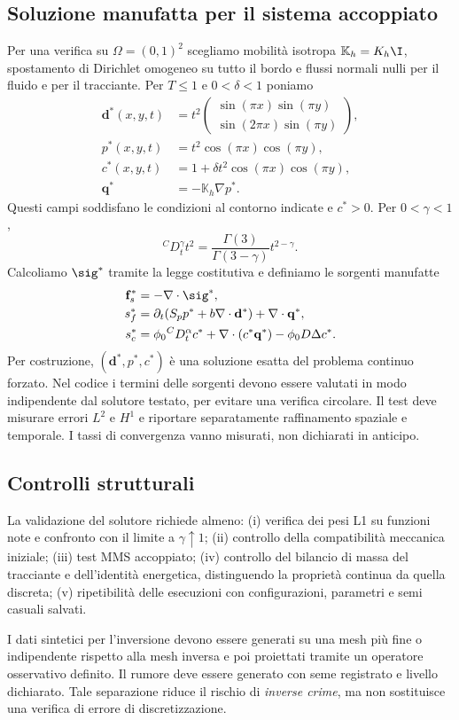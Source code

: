 \subsection{Soluzione manufatta per il sistema accoppiato}
Per una verifica su $\Omega=(0,1)^2$ scegliamo mobilità isotropa $\mathbb K_h=K_h\I$, spostamento di Dirichlet omogeneo su tutto il bordo e flussi normali nulli per il fluido e per il tracciante. Per $T\le1$ e $0<\delta<1$ poniamo
\begin{align}
\mathbf d^*(x,y,t)&=t^2\begin{pmatrix}\sin(\pi x)\sin(\pi y)\\\sin(2\pi x)\sin(\pi y)\end{pmatrix},\\
p^*(x,y,t)&=t^2\cos(\pi x)\cos(\pi y),\\
c^*(x,y,t)&=1+\delta t^2\cos(\pi x)\cos(\pi y),\\
\mathbf q^*&=-\mathbb K_h\nabla p^*.
\end{align}
Questi campi soddisfano le condizioni al contorno indicate e $c^*>0$. Per $0<\gamma<1$,
\begin{equation}
{}^C D_t^\gamma t^2=\frac{\Gamma(3)}{\Gamma(3-\gamma)}t^{2-\gamma}.
\label{eq:caputo-t2}
\end{equation}
Calcoliamo $\sig^*$ tramite la legge costitutiva e definiamo le sorgenti manufatte
\begin{align}
\mathbf f_s^*&=-\nabla\cdot\sig^*,\\
s_f^*&=\partial_t(S_pp^*+b\nabla\cdot\mathbf d^*)+\nabla\cdot\mathbf q^*,\\
s_c^*&=\phi_0{}^C D_t^\alpha c^*+\nabla\cdot(c^*\mathbf q^*)-\phi_0D\Delta c^*.
\label{eq:mms-sources}
\end{align}
Per costruzione, $(\mathbf d^*,p^*,c^*)$ è una soluzione esatta del problema continuo forzato. Nel codice i termini delle sorgenti devono essere valutati in modo indipendente dal solutore testato, per evitare una verifica circolare. Il test deve misurare errori $L^2$ e $H^1$ e riportare separatamente raffinamento spaziale e temporale. I tassi di convergenza vanno misurati, non dichiarati in anticipo.

\subsection{Controlli strutturali}
La validazione del solutore richiede almeno: (i) verifica dei pesi L1 su funzioni note e confronto con il limite a $\gamma\uparrow1$; (ii) controllo della compatibilità meccanica iniziale; (iii) test MMS accoppiato; (iv) controllo del bilancio di massa del tracciante e dell'identità energetica, distinguendo la proprietà continua da quella discreta; (v) ripetibilità delle esecuzioni con configurazioni, parametri e semi casuali salvati.

I dati sintetici per l'inversione devono essere generati su una mesh più fine o indipendente rispetto alla mesh inversa e poi proiettati tramite un operatore osservativo definito. Il rumore deve essere generato con seme registrato e livello dichiarato. Tale separazione riduce il rischio di \emph{inverse crime}, ma non sostituisce una verifica di errore di discretizzazione.
